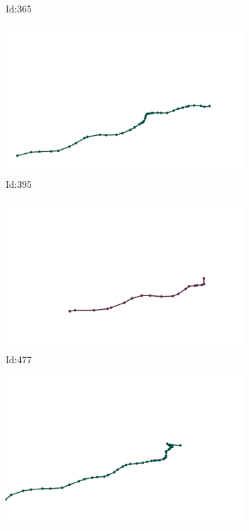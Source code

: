 \documentclass[12pt,twoside]{report}
\begin{document}
\begin{figure}
\begin{subfigure}[b]{0.20\textwidth}
\caption{Id:365}
\end{subfigure}
\begin{subfigure}[b]{0.20\textwidth}
\centering
\includegraphics[width=\textwidth]{../trajectories/395.png}
\caption{Id:395}
\end{subfigure}
\begin{subfigure}[b]{0.20\textwidth}
\centering
\includegraphics[width=\textwidth]{../trajectories/477.png}
\caption{Id:477}
\end{subfigure}
\begin{subfigure}[b]{0.20\textwidth}
\centering
\includegraphics[width=\textwidth]{../trajectories/493.png}

\end{subfigure}
\end{figure}
\end{document}
